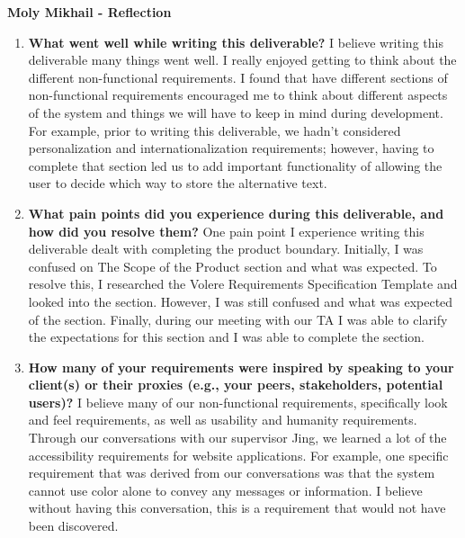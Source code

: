 \textbf{Moly Mikhail  - Reflection}
\begin{enumerate}
  \item \textbf{What went well while writing this deliverable?} \newline
  I believe writing this deliverable many things went well. I really enjoyed getting to think about the different
  non-functional requirements. I found that have different sections of non-functional requirements encouraged me to think about different 
  aspects of the system and things we will have to keep in mind during development. For example, prior to writing 
  this deliverable, we hadn’t considered personalization and internationalization requirements; however, having to
  complete that section led us to add important functionality of allowing the user to decide which way
  to store the alternative text. 
  
\item \textbf{What pain points did you experience during this
    deliverable, and how did you resolve them?} \newline
  One pain point I experience writing this deliverable dealt with completing the product boundary. 
  Initially, I was confused on The Scope of the Product section and what was expected. 
  To resolve this, I researched the Volere Requirements Specification Template and looked into the section. 
  However, I was still confused and what was expected of the section. Finally, during our meeting with
  our TA I was able to clarify the expectations for this section and I was able to complete the section. 
 
   \item \textbf{How many of your requirements were inspired by
      speaking to your client(s) or their proxies (e.g., your peers,
    stakeholders, potential users)?} \newline
  I believe many of our non-functional requirements, specifically look and feel 
  requirements, as well as usability and humanity requirements. Through our
  conversations with our supervisor Jing, we learned a lot of the accessibility
  requirements for website applications. For example, one specific requirement 
  that was derived from our conversations was that the system cannot use color alone to convey any messages
  or information. I believe without having this conversation, this is a requirement that would not have been discovered. 
 

\end{enumerate}
